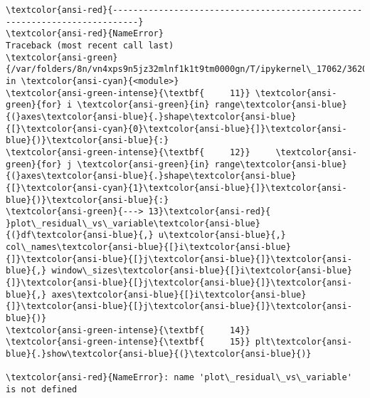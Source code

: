 \documentclass[11pt]{article}
\makeatletter
\newcommand{\boxspacing}{\kern\kvtcb@left@rule\kern\kvtcb@boxsep}
\newcommand{\prompt}[4]{
        {\ttfamily\llap{{\color{#2}[#3]:\hspace{3pt}#4}}\vspace{-\baselineskip}}
    }
\makeatother
\begin{document}
    \begin{Verbatim}[commandchars=\\\{\}, frame=single, framerule=2mm, rulecolor=\color{outerrorbackground}]
\textcolor{ansi-red}{---------------------------------------------------------------------------}
\textcolor{ansi-red}{NameError}                                 Traceback (most recent call last)
\textcolor{ansi-green}{/var/folders/8n/vn4xps9n5jz32mlnf1k1t9tm0000gn/T/ipykernel\_17062/3620380712.py} in \textcolor{ansi-cyan}{<module>}
\textcolor{ansi-green-intense}{\textbf{     11}} \textcolor{ansi-green}{for} i \textcolor{ansi-green}{in} range\textcolor{ansi-blue}{(}axes\textcolor{ansi-blue}{.}shape\textcolor{ansi-blue}{[}\textcolor{ansi-cyan}{0}\textcolor{ansi-blue}{]}\textcolor{ansi-blue}{)}\textcolor{ansi-blue}{:}
\textcolor{ansi-green-intense}{\textbf{     12}}     \textcolor{ansi-green}{for} j \textcolor{ansi-green}{in} range\textcolor{ansi-blue}{(}axes\textcolor{ansi-blue}{.}shape\textcolor{ansi-blue}{[}\textcolor{ansi-cyan}{1}\textcolor{ansi-blue}{]}\textcolor{ansi-blue}{)}\textcolor{ansi-blue}{:}
\textcolor{ansi-green}{---> 13}\textcolor{ansi-red}{         }plot\_residual\_vs\_variable\textcolor{ansi-blue}{(}df\textcolor{ansi-blue}{,} u\textcolor{ansi-blue}{,} col\_names\textcolor{ansi-blue}{[}i\textcolor{ansi-blue}{]}\textcolor{ansi-blue}{[}j\textcolor{ansi-blue}{]}\textcolor{ansi-blue}{,} window\_sizes\textcolor{ansi-blue}{[}i\textcolor{ansi-blue}{]}\textcolor{ansi-blue}{[}j\textcolor{ansi-blue}{]}\textcolor{ansi-blue}{,} axes\textcolor{ansi-blue}{[}i\textcolor{ansi-blue}{]}\textcolor{ansi-blue}{[}j\textcolor{ansi-blue}{]}\textcolor{ansi-blue}{)}
\textcolor{ansi-green-intense}{\textbf{     14}} 
\textcolor{ansi-green-intense}{\textbf{     15}} plt\textcolor{ansi-blue}{.}show\textcolor{ansi-blue}{(}\textcolor{ansi-blue}{)}

\textcolor{ansi-red}{NameError}: name 'plot\_residual\_vs\_variable' is not defined
    \end{Verbatim}

    \begin{center}
    \end{center}
    { \hspace*{\fill} \\}
    
    \begin{tcolorbox}[breakable, size=fbox, boxrule=1pt, pad at break*=1mm,colback=cellbackground, colframe=cellborder]
\prompt{In}{incolor}{ }{\boxspacing}
\begin{Verbatim}[commandchars=\\\{\}]

\end{Verbatim}
\end{tcolorbox}
\end{document}
